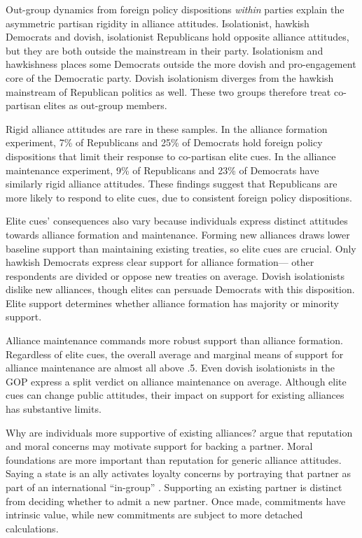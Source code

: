 \documentclass[12pt]{article}
\begin{document}
Out-group dynamics from foreign policy dispositions \textit{within} parties explain the asymmetric partisan rigidity in alliance attitudes. 
Isolationist, hawkish Democrats and dovish, isolationist Republicans hold opposite alliance attitudes, but they are both outside the mainstream in their party.
Isolationism and hawkishness places some Democrats outside the more dovish and pro-engagement core of the Democratic party. 
Dovish isolationism diverges from the hawkish mainstream of Republican politics as well. 
These two groups therefore treat co-partisan elites as out-group members.  


Rigid alliance attitudes are rare in these samples.
In the alliance formation experiment, 7\% of Republicans and 25\% of Democrats hold foreign policy dispositions that limit their response to co-partisan elite cues. 
In the alliance maintenance experiment, 9\% of Republicans and 23\% of Democrats have similarly rigid alliance attitudes.
These findings suggest that Republicans are more likely to respond to elite cues, due to consistent foreign policy dispositions.


Elite cues' consequences also vary because individuals express distinct attitudes towards alliance formation and maintenance. 
Forming new alliances draws lower baseline support than maintaining existing treaties, so elite cues are crucial. 
Only hawkish Democrats express clear support for alliance formation--- other respondents are divided or oppose new treaties on average.
Dovish isolationists dislike new alliances, though elites can persuade Democrats with this disposition. 
Elite support determines whether alliance formation has majority or minority support. 


Alliance maintenance commands more robust support than alliance formation. 
Regardless of elite cues, the overall average and marginal means of support for alliance maintenance are almost all above .5. 
Even dovish isolationists in the GOP express a split verdict on alliance maintenance on average.
Although elite cues can change public attitudes, their impact on support for existing alliances has substantive limits.


Why are individuals more supportive of existing alliances?
\citet{TomzWeeks2021} argue that reputation and moral concerns may motivate support for backing a partner.
Moral foundations are more important than reputation for generic alliance attitudes. 
Saying a state is an ally activates loyalty concerns by portraying that partner as part of an international ``in-group'' \citep[pg. 814]{TomzWeeks2021}. 
Supporting an existing partner is distinct from deciding whether to admit a new partner.
Once made, commitments have intrinsic value, while new commitments are subject to more detached calculations.
\end{document}
